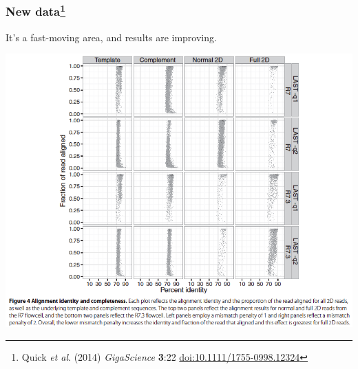 \begin{frame}
  \frametitle{New data\footnote{\tiny{Quick \textit{et al}. (2014) \textit{GigaScience} \textbf{3}:22 \href{http://dx.doi.org/10.1111/1755-0998.12324}{doi:10.1111/1755-0998.12324}}}}
  It's a fast-moving area, and results are improving.
    \begin{center}
      \includegraphics[height=0.65\textheight]{images/nanopore_quick}
    \end{center}           
\end{frame}

